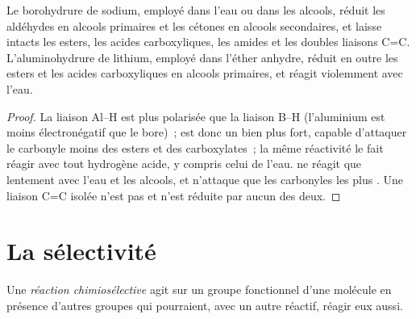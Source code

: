 \begin{proposition}\label{prop:b1:organic-redox:hydride-scope}
Le borohydrure de sodium, employé dans l'eau ou dans les alcools, réduit
les aldéhydes en alcools primaires et les cétones en alcools
secondaires, et laisse intacts les esters, les acides carboxyliques, les
amides et les doubles liaisons C=C. L'aluminohydrure de lithium,
employé dans l'éther anhydre, réduit en outre les esters et les acides
carboxyliques en alcools primaires, et réagit violemment avec l'eau.
\end{proposition}

\begin{proof}
La liaison Al--H est plus polarisée que la liaison B--H (l'aluminium est
moins électronégatif que le bore)~;  est donc un  bien plus fort, capable d'attaquer le carbonyle moins
 des esters et des carboxylates~; la même réactivité le fait
réagir avec tout hydrogène acide, y compris celui de l'eau.  ne
réagit que lentement avec l'eau et les alcools, et n'attaque que les
carbonyles les plus . Une liaison C=C isolée n'est pas
 et n'est réduite par aucun des deux.
\end{proof}

\section{La sélectivité}

\begin{definition}\label{def:b1:organic-redox:chemoselective}
Une \emph{réaction chimiosélective}
agit sur un groupe fonctionnel d'une molécule en présence d'autres
groupes qui pourraient, avec un autre réactif, réagir eux aussi.
\end{definition}

